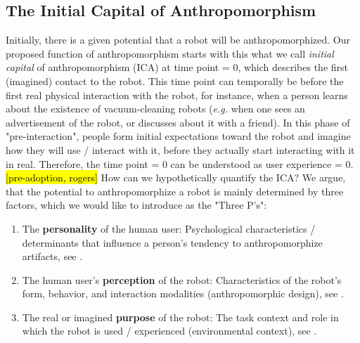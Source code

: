 \documentclass[twocolumn]{svjour3}          %
\begin{document}
\subsection{The Initial Capital of Anthropomorphism}
\label{sec:7.1}

	Initially, there is a given potential that a robot will be anthropomorphized. Our proposed function of anthropomorphism starts with this what we call \textit{initial capital} of anthropomorphism (ICA) at time point = 0, which describes the first (imagined) contact to the robot. This time point can temporally be before the first real physical interaction with the robot, for instance, when a person learns about the existence of vacuum-cleaning robots (\textit{e.g.} when one sees an advertisement of the robot, or discusses about it with a friend). In this phase of "pre-interaction", people form initial expectations toward the robot and imagine how they will use / interact with it, before they actually start interacting with it in real. Therefore, the time point = 0 can be understood as user experience = 0. \hl{[pre-adoption, rogers]} How can we hypothetically quantify the ICA? We argue, that the potential to anthropomorphize a robot is mainly determined by three factors, which we would like to introduce as the "Three P's":  
	
\begin{enumerate}

	\item The \textbf{personality} of the human user: Psychological characteristics / determinants that influence a person's tendency to anthropomorphize artifacts, see \cite{epley_seeing_2007}.
	
	\item The human user's \textbf{perception} of the robot: Characteristics of the robot's form, behavior, and interaction modalities (anthropomorphic design), see \cite{fong_survey_2003}.
	
	\item The real or imagined \textbf{purpose} of the robot: The task context and role in which the robot is used / experienced (environmental context), see \cite{joosse_what_2013}.

\end{enumerate}	
\end{document}
